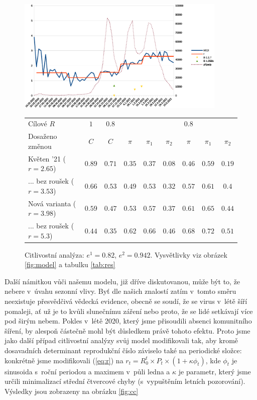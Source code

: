 \begin{figure}
\begin{center}
\includegraphics[width=10cm]{pic/wholee} 

\begin{tabular}{l|c|c|ccc|ccc}									
Cílové $R$	& $1$	& $0.8$	&	&	&	& $0.8$	&	&	\\ 
Dosaženo změnou	& $C$	& $C$	& $\pi$	& $\pi_1$	& $\pi_2$	& $\pi$	& $\pi_1$	& $\pi_2$	\\ \hline
Květen '21 ($r=2.65$)	& $0.89$	& $0.71$	& $0.35$	& $0.37$	& $0.08$	& $0.46$	& $0.59$	& $0.19$	\\
... bez roušek ($r=3.53$)	& $0.66$	& $0.53$	& $0.49$	& $0.53$	& $0.32$	& $0.57$	& $0.61$	& $0.4$	\\
Nová varianta ($r=3.98$)	& $0.59$	& $0.47$	& $0.53$	& $0.57$	& $0.37$	& $0.61$	& $0.65$	& $0.44$	\\
... bez roušek ($r=5.3$)	& $0.44$	& $0.35$	& $0.62$	& $0.66$	& $0.46$	& $0.68$	& $0.72$	& $0.51$
\end{tabular}									

\caption{Citlivostní analýza: $e^{1}=0.82$, $e^{2}=0.942.$ Vysvětlivky viz obrázek \ref{fig:model} a tabulku \ref{tab:res}}
\label{fig:cv}

\end{center}
\end{figure}


Další námitkou vůči našemu modelu, již dříve diskutovanou, může být to, že nebere v~úvahu sezonní
vlivy. Byť dle našich znalostí zatím v~tomto směru neexistuje přesvědčivá vědecká
evidence, obecně se soudí, že se virus v~létě šíří pomaleji, ať už
je to kvůli slunečnímu záření nebo proto, že se lidé setkávají více
pod širým nebem. Pokles v~létě 2020, který jsme přisoudili absenci
komunitního šíření, by alespoň částečně mohl být důsledkem právě tohoto
efektu. Proto jsme jako další případ citlivostní analýzy svůj model modifikovali tak, aby kromě dosavadních determinant reprodukční číslo záviselo
také na periodické složce: konkrétně jsme modifikovali (\ref{eq:r}) na 
$r_{t}=R_{0}^{t}\times P_{t}\times(1+\kappa\phi_{t})$, kde $\phi_{t}$
je sinusoida s~roční periodou a maximem v~půli ledna a $\kappa$ je
parametr, který jsme určili minimalizací střední čtvercové chyby
(s~vypuštěním letních pozorování). Výsledky jsou zobrazeny na obrázku \ref{fig:cc}

